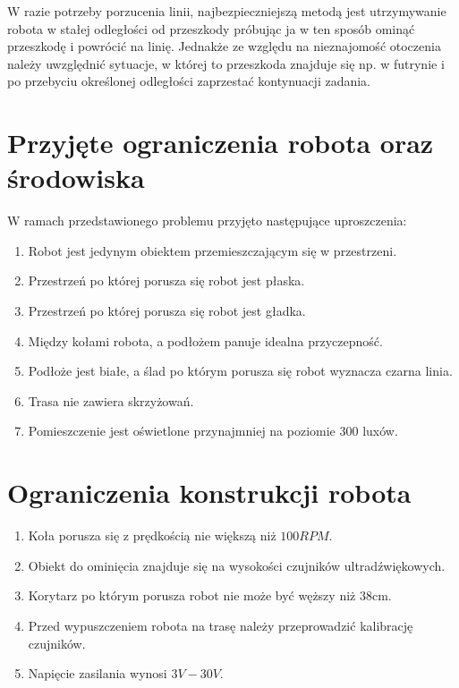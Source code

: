 W razie potrzeby porzucenia linii, najbezpieczniejszą metodą jest utrzymywanie robota w stałej odległości od przeszkody próbując ja w ten sposób ominąć przeszkodę i powrócić na linię. Jednakże ze względu na nieznajomość otoczenia należy uwzględnić sytuacje, w której to przeszkoda znajduje się np. w futrynie i po przebyciu określonej odległości zaprzestać kontynuacji zadania.

\section{Przyjęte ograniczenia robota oraz środowiska}
W ramach przedstawionego problemu przyjęto następujące uproszczenia:
\begin{enumerate}
    \item Robot jest jedynym obiektem przemieszczającym się w przestrzeni.
    \item Przestrzeń po której porusza się robot jest płaska.
    \item Przestrzeń po której porusza się robot jest gładka.
    \item Między kołami robota, a podłożem panuje idealna przyczepność.
    \item Podłoże jest białe, a ślad po którym porusza się robot wyznacza czarna linia.
    \item Trasa nie zawiera skrzyżowań.
    \item Pomieszczenie jest oświetlone przynajmniej na poziomie 300 luxów.
\end{enumerate}

\section{Ograniczenia konstrukcji robota}
\begin{enumerate}
    \item Koła porusza się z prędkością nie większą niż $100RPM$.
    \item Obiekt do ominięcia znajduje się na wysokości czujników ultradźwiękowych.
    \item Korytarz po którym porusza robot nie może być węższy niż 38cm.
    \item Przed wypuszczeniem robota na trasę należy przeprowadzić kalibrację czujników.
    \item Napięcie zasilania wynosi $3V-30V$.
\end{enumerate}